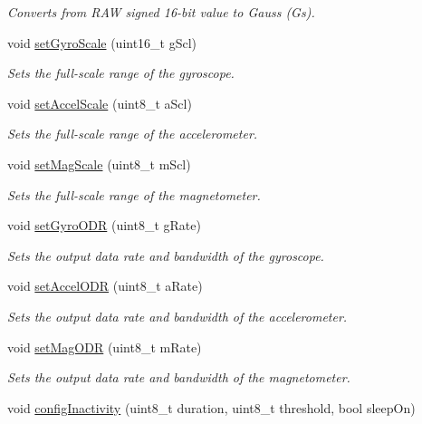 \begin{DoxyCompactItemize}
\begin{DoxyCompactList}\small\item\em Converts from R\+AW signed 16-\/bit value to Gauss (Gs). \end{DoxyCompactList}\item 
void \hyperlink{classLSM9DS1_a115d304ebcdc8c701f3e5a5d397250aa}{set\+Gyro\+Scale} (uint16\+\_\+t g\+Scl)
\begin{DoxyCompactList}\small\item\em Sets the full-\/scale range of the gyroscope. \end{DoxyCompactList}\item 
void \hyperlink{classLSM9DS1_a8656d2de1ff9cc4cb76214e4561d02c4}{set\+Accel\+Scale} (uint8\+\_\+t a\+Scl)
\begin{DoxyCompactList}\small\item\em Sets the full-\/scale range of the accelerometer. \end{DoxyCompactList}\item 
void \hyperlink{classLSM9DS1_ad7604159a07b0d088cdfb6ba4a0093b0}{set\+Mag\+Scale} (uint8\+\_\+t m\+Scl)
\begin{DoxyCompactList}\small\item\em Sets the full-\/scale range of the magnetometer. \end{DoxyCompactList}\item 
void \hyperlink{classLSM9DS1_ab8fc33c8da4fc5c379e880ff57d331fa}{set\+Gyro\+O\+DR} (uint8\+\_\+t g\+Rate)
\begin{DoxyCompactList}\small\item\em Sets the output data rate and bandwidth of the gyroscope. \end{DoxyCompactList}\item 
void \hyperlink{classLSM9DS1_a76d72839cdecc3f1c4ee6fff578182c5}{set\+Accel\+O\+DR} (uint8\+\_\+t a\+Rate)
\begin{DoxyCompactList}\small\item\em Sets the output data rate and bandwidth of the accelerometer. \end{DoxyCompactList}\item 
void \hyperlink{classLSM9DS1_a8bc672fba680edc468a643fd58046b41}{set\+Mag\+O\+DR} (uint8\+\_\+t m\+Rate)
\begin{DoxyCompactList}\small\item\em Sets the output data rate and bandwidth of the magnetometer. \end{DoxyCompactList}\item 
void \hyperlink{classLSM9DS1_a1e318c5e7c1d500c3ab2602c46265354}{config\+Inactivity} (uint8\+\_\+t duration, uint8\+\_\+t threshold, bool sleep\+On)

\end{DoxyCompactItemize}
